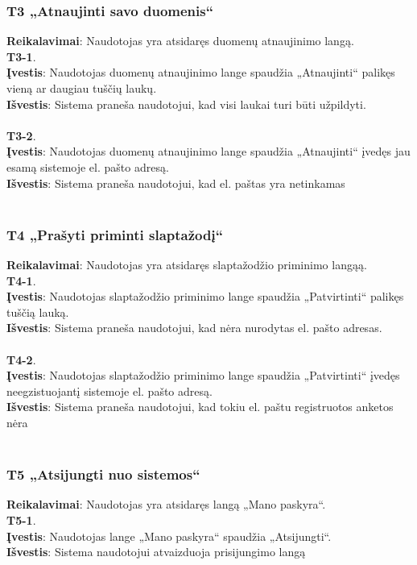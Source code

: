 \documentclass{VUMIFPSbakalaurinis}
\begin{document}
\subsubsection{T3 „Atnaujinti savo duomenis“}
\textbf{Reikalavimai}: Naudotojas yra atsidaręs duomenų atnaujinimo langą. \\
\textbf{T3-1}. \\
\textbf{Įvestis}: Naudotojas duomenų atnaujinimo lange spaudžia „Atnaujinti“ palikęs vieną ar daugiau tuščių laukų. \\
\textbf{Išvestis}: Sistema praneša naudotojui, kad visi laukai turi būti užpildyti. \\ \\
\textbf{T3-2}. \\
\textbf{Įvestis}: Naudotojas duomenų atnaujinimo lange spaudžia „Atnaujinti“ įvedęs jau esamą sistemoje el. pašto adresą. \\
\textbf{Išvestis}: Sistema praneša naudotojui, kad el. paštas yra netinkamas\\ \\

\subsubsection{T4 „Prašyti priminti slaptažodį“}
\textbf{Reikalavimai}: Naudotojas yra atsidaręs slaptažodžio priminimo langąą. \\
\textbf{T4-1}. \\
\textbf{Įvestis}: Naudotojas slaptažodžio priminimo lange spaudžia „Patvirtinti“ palikęs tuščią lauką. \\
\textbf{Išvestis}: Sistema praneša naudotojui, kad nėra nurodytas el. pašto adresas. \\ \\
\textbf{T4-2}. \\
\textbf{Įvestis}: Naudotojas slaptažodžio priminimo lange spaudžia „Patvirtinti“ įvedęs neegzistuojantį sistemoje el. pašto adresą. \\
\textbf{Išvestis}: Sistema praneša naudotojui, kad tokiu el. paštu registruotos anketos nėra\\ \\

\subsubsection{T5 „Atsijungti nuo sistemos“}
\textbf{Reikalavimai}: Naudotojas yra atsidaręs langą „Mano paskyra“. \\
\textbf{T5-1}. \\
\textbf{Įvestis}: Naudotojas lange „Mano paskyra“ spaudžia „Atsijungti“. \\
\textbf{Išvestis}: Sistema naudotojui atvaizduoja prisijungimo langą \\ \\
\end{document}
